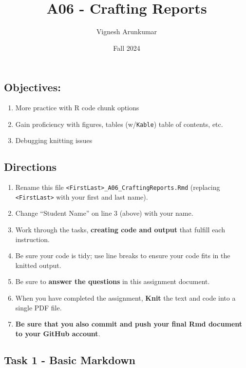 \documentclass[
]{article}
\title{A06 - Crafting Reports}
\author{Vignesh Arunkumar}
\date{Fall 2024}
\providecommand{\tightlist}{%
  \setlength{\itemsep}{0pt}\setlength{\parskip}{0pt}}
\begin{document}
\maketitle

{
\setcounter{tocdepth}{3}
\tableofcontents
}
\subsection{Objectives:}\label{objectives}

\begin{enumerate}
\def\labelenumi{\arabic{enumi}.}
\tightlist
\item
  More practice with R code chunk options
\item
  Gain proficiency with figures, tables (w/\texttt{Kable}) table of
  contents, etc.
\item
  Debugging knitting issues
\end{enumerate}

\subsection{Directions}\label{directions}

\begin{enumerate}
\def\labelenumi{\arabic{enumi}.}
\tightlist
\item
  Rename this file
  \texttt{\textless{}FirstLast\textgreater{}\_A06\_CraftingReports.Rmd}
  (replacing \texttt{\textless{}FirstLast\textgreater{}} with your first
  and last name).
\item
  Change ``Student Name'' on line 3 (above) with your name.
\item
  Work through the tasks, \textbf{creating code and output} that fulfill
  each instruction.
\item
  Be sure your code is tidy; use line breaks to ensure your code fits in
  the knitted output.
\item
  Be sure to \textbf{answer the questions} in this assignment document.
\item
  When you have completed the assignment, \textbf{Knit} the text and
  code into a single PDF file.
\item
  \textbf{Be sure that you also commit and push your final Rmd document
  to your GitHub account}.
\end{enumerate}

\subsection{Task 1 - Basic Markdown}\label{task-1---basic-markdown}
\end{document}
